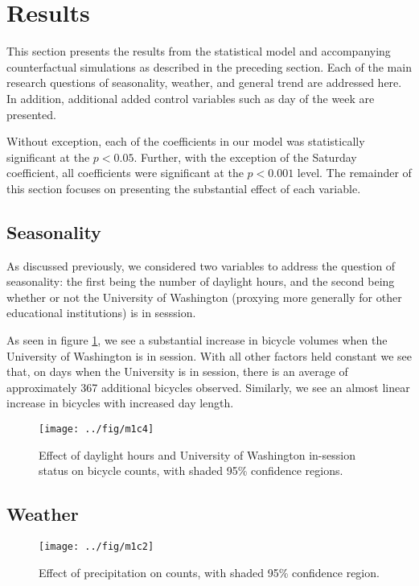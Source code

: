 \documentclass[12pt,letterpaper,article]{memoir} %
\begin{document}
\section*{Results}
% 
% 
This section presents the results from the statistical model and
accompanying counterfactual simulations as described in the preceding
section. Each of the main research questions of seasonality, weather,
and general trend are addressed here. In addition, additional added
control variables such as day of the week are presented.

Without exception, each of the coefficients in our model was
statistically significant at the $p < 0.05$. Further, with the
exception of the Saturday coefficient, all coefficients were
significant at the $p < 0.001$ level. The remainder of this section
focuses on presenting the substantial effect of each variable.

\subsection*{Seasonality}
As discussed previously, we considered two variables to address the
question of seasonality: the first being the number of daylight hours,
and the second being whether or not the University of Washington
(proxying more generally for other educational institutions) is in
sesssion.

As seen in figure \ref{fg:seasonality}, we see a substantial increase
in bicycle volumes when the University of Washington is in session.
With all other factors held constant we see that, on days when the
University is in session, there is an average of approximately 367
additional bicycles observed. Similarly, we see an almost linear
increase in bicycles with increased day length.

\begin{figure}[h!]
  \centering
  \texttt{[image: ../fig/m1c4]}
  \caption{Effect of daylight hours and University of Washington
    in-session status on bicycle counts, with shaded 95\% confidence
    regions.}
  \label{fg:seasonality}
\end{figure}


\subsection*{Weather}

\begin{figure}[h!]
  \centering
  \texttt{[image: ../fig/m1c2]}
  \caption{Effect of precipitation on counts, with shaded 95\%
    confidence region.}
  \label{fg:precipitation}
\end{figure}
\end{document}
